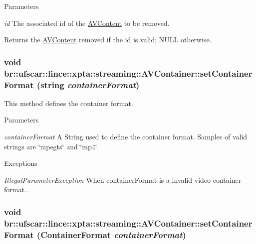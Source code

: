 \begin{DoxyParams}{Parameters}
\item[{\em id}]The associated id of the \hyperlink{classbr_1_1ufscar_1_1lince_1_1xpta_1_1streaming_1_1AVContent}{AVContent} to be removed. \end{DoxyParams}
\begin{DoxyReturn}{Returns}
the \hyperlink{classbr_1_1ufscar_1_1lince_1_1xpta_1_1streaming_1_1AVContent}{AVContent} removed if the id is valid; NULL otherwise. 
\end{DoxyReturn}
\hypertarget{classbr_1_1ufscar_1_1lince_1_1xpta_1_1streaming_1_1AVContainer_a5afa272e28654c1ec17bfd0746cd67ce}{
\subsubsection[{setContainerFormat}]{\setlength{\rightskip}{0pt plus 5cm}void br::ufscar::lince::xpta::streaming::AVContainer::setContainerFormat (string {\em containerFormat})}}
\label{classbr_1_1ufscar_1_1lince_1_1xpta_1_1streaming_1_1AVContainer_a5afa272e28654c1ec17bfd0746cd67ce}


This method defines the container format. 


\begin{DoxyParams}{Parameters}
\item[{\em containerFormat}]A String used to define the container format. Samples of valid strings are \char`\"{}mpegts\char`\"{} and \char`\"{}mp4\char`\"{}. \end{DoxyParams}

\begin{DoxyExceptions}{Exceptions}
\item[{\em IllegalParameterException}]When containerFormat is a invalid video container format.. \end{DoxyExceptions}
\hypertarget{classbr_1_1ufscar_1_1lince_1_1xpta_1_1streaming_1_1AVContainer_abae4430b7bbbcbc2cd33d142368e7970}{
\subsubsection[{setContainerFormat}]{\setlength{\rightskip}{0pt plus 5cm}void br::ufscar::lince::xpta::streaming::AVContainer::setContainerFormat (ContainerFormat {\em containerFormat})}}
\label{classbr_1_1ufscar_1_1lince_1_1xpta_1_1streaming_1_1AVContainer_abae4430b7bbbcbc2cd33d142368e7970}


